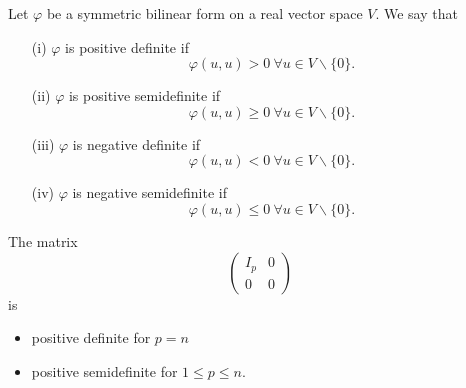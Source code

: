 \documentclass[a4paper]{scrartcl}
\begin{document}
\begin{definition}
     Let $\varphi$ be a symmetric bilinear form on a real vector space $V$. We say that 
     \begin{itemize}
         \item[(i)] $\varphi$ is positive definite if 
         \[\varphi (u,u) >0 \ \forall u \in V \backslash \{0\}.\]
         \item[(ii)] $\varphi$ is positive semidefinite if 
         \[\varphi (u,u) \geq 0 \ \forall u \in V \backslash \{0\}.\]
         \item[(iii)] $\varphi$ is negative definite if 
         \[\varphi (u,u) <0 \ \forall u \in V \backslash \{0\}.\]
         \item[(iv)] $\varphi$ is negative semidefinite if 
         \[\varphi (u,u) \leq 0 \ \forall u \in V \backslash \{0\}.\]
     \end{itemize}
\end{definition}
\begin{example}
     The matrix 
     \[\left(
     \begin{array}{c|c}
          I_p &0\\
          \hline
          0&0
     \end{array}
     \right)
     \]
     is
     \begin{itemize}
         \item positive definite for $p=n$
         \item positive semidefinite for $1 \leq p \leq n$.
     \end{itemize}
\end{example}
\end{document}
